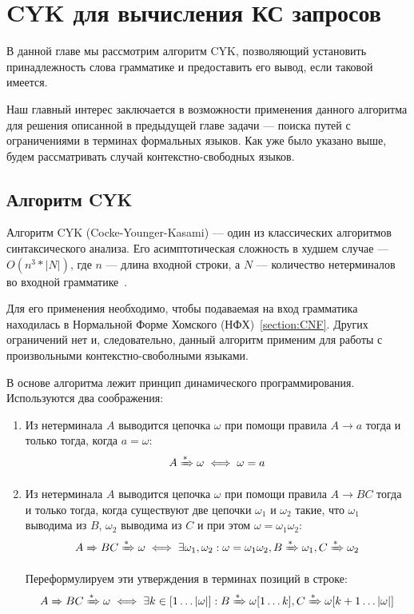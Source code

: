 \chapter{CYK для вычисления КС запросов}\label{chpt:CFPQ_CYK}

В данной главе мы рассмотрим алгоритм CYK, позволяющий установить принадлежность слова грамматике и предоставить его вывод, если таковой имеется.

Наш главный интерес заключается в возможности применения данного алгоритма для решения описанной в предыдущей главе задачи --- поиска путей с ограничениями в терминах формальных языков. Как уже было указано выше, будем рассматривать случай контекстно-свободных языков.

\section{Алгоритм CYK}\label{sect:lin_CYK}

Алгоритм CYK (Cocke-Younger-Kasami) --- один из классических алгоритмов синтаксического анализа. Его асимптотическая сложность в худшем случае --- $O(n^3 * |N|)$, где $n$ --- длина входной строки, а $N$ --- количество нетерминалов во входной грамматике~\cite{Hopcroft+Ullman/79/Introduction}.

Для его применения необходимо, чтобы подаваемая на вход грамматика находилась в Нормальной Форме Хомского (НФХ)~\ref{section:CNF}. Других ограничений нет и, следовательно, данный алгоритм применим для работы с произвольными контекстно-своболными языками.

В основе алгоритма лежит принцип динамического программирования. Используются два соображения:

\begin{enumerate}
\item Из нетерминала $A$ выводится цепочка $\omega$ при помощи правила $A \to a$ тогда и только тогда, когда $a= \omega$:
\[
  A \xRightarrow[]{*} \omega \iff \omega = a
\]

\item Из нетерминала $A$ выводится цепочка $\omega$ при помощи правила $A \to B C$ тогда и только тогда, когда существуют две цепочки $\omega_1$ и $\omega_2$ такие, что $\omega_1$ выводима из $B$, $\omega_2$ выводима из $C$ и при этом $\omega = \omega_1 \omega_2$:
\[
A \xRightarrow[]{} B C \xRightarrow[]{*} \omega \iff \exists \omega_1, \omega_2 : \omega = \omega_1 \omega_2, B \xRightarrow[]{*} \omega_1, C \xRightarrow[]{*} \omega_2
\]

Переформулируем эти утверждения в терминах позиций в строке:
\[
A \xRightarrow[]{} B C \xRightarrow[]{*} \omega \iff \exists k \in [1 \dots |\omega|] : B \xRightarrow[]{*} \omega[1 \dots k], C \xRightarrow[]{*} \omega[k+1 \dots |\omega|]
\]
\end{enumerate}

